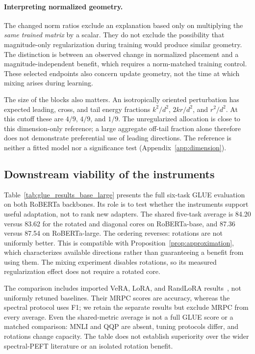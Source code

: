 \paragraph{Interpreting normalized geometry.}
The changed norm ratios exclude an explanation based only on multiplying the \emph{same trained matrix} by a scalar. They do not exclude the possibility that magnitude-only regularization during training would produce similar geometry. The distinction is between an observed change in normalized placement and a magnitude-independent benefit, which requires a norm-matched training control. These selected endpoints also concern update geometry, not the time at which mixing arises during learning.

The size of the blocks also matters. An isotropically oriented perturbation has expected leading, cross, and tail energy fractions $k^2/d^2$, $2kr/d^2$, and $r^2/d^2$. At this cutoff these are $4/9$, $4/9$, and $1/9$. The unregularized allocation is close to this dimension-only reference; a large aggregate off-tail fraction alone therefore does not demonstrate preferential use of leading directions. The reference is neither a fitted model nor a significance test (Appendix~\ref{app:dimension}).

\subsection{Downstream viability of the instruments}
Table~\ref{tab:glue_results_base_large} presents the full six-task GLUE evaluation on both RoBERTa backbones. Its role is to test whether the instruments support useful adaptation, not to rank new adapters. The shared five-task average is 84.20 versus 83.62 for the rotated and diagonal cores on RoBERTa-base, and 87.36 versus 87.54 on RoBERTa-large. The ordering reverses: rotations are not uniformly better. This is compatible with Proposition~\ref{prop:approximation}, which characterizes available directions rather than guaranteeing a benefit from using them. The mixing experiment disables rotations, so its measured regularization effect does not require a rotated core.



The comparison includes imported VeRA, LoRA, and RandLoRA results~\citep{albert2025randlora}, not uniformly retuned baselines. Their MRPC scores are accuracy, whereas the spectral protocol uses F1; we retain the separate results but exclude MRPC from every average. Even the shared-metric average is not a full GLUE score or a matched comparison: MNLI and QQP are absent, tuning protocols differ, and rotations change capacity. The table does not establish superiority over the wider spectral-PEFT literature or an isolated rotation benefit.

